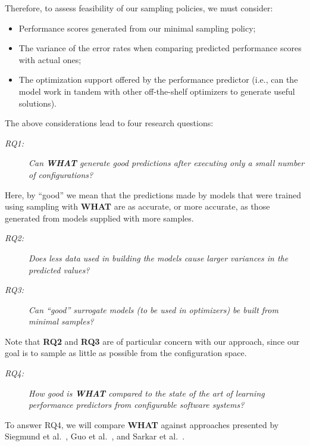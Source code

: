 \documentclass{newsig}
\newcommand{\what}{{\bf WHAT }}
\begin{document}
Therefore, to assess feasibility of our sampling policies, we must consider:
\begin{itemize}
\item Performance scores generated from our minimal sampling policy;
\item The variance of the error rates when comparing predicted performance scores with actual ones;
\item The optimization support offered by the performance predictor (i.e., can the model work in tandem with other off-the-shelf optimizers to generate useful solutions).
\end{itemize}
The above considerations lead to four research questions:
\begin{description}
\item[{\em RQ1:}] {\em Can  \what generate good predictions after
executing only a small number of configurations?}
\end{description}
Here, by ``good'' we mean that the predictions made by models that were trained using sampling with \what are as accurate, or more accurate,
as those generated from models supplied with more samples.
\begin{description}
\item[{\em RQ2:}] {\em
Does less data used in building the models cause larger variances in the predicted values?}
\item[{\em RQ3:}] {\em
Can ``good'' surrogate models (to be used in optimizers)
be built from minimal samples?}
\end{description}
Note that {\bf RQ2} and {\bf RQ3} are of particular concern with our approach,
since our goal is to sample as little as possible from the configuration space.
\begin{description}
\item[{\em RQ4:}] {\em How good is \what compared to the state of the art of
learning performance predictors from configurable software systems?}
\end{description}

To answer RQ4, we will compare \what 
          against approaches presented by Siegmund et al.~\cite{siegmund2012predicting}, Guo et al.~\cite{guo2013variability}, and Sarkar et al.~\cite{sarkar2015cost}.
 
\end{document}

